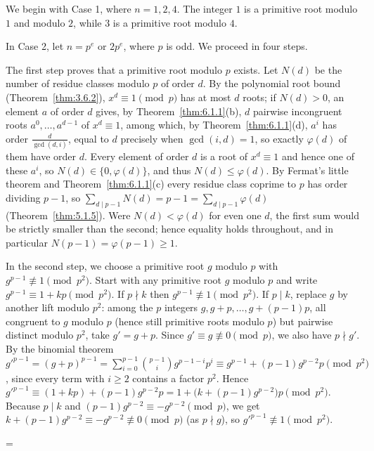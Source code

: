 \documentclass[11pt]{article}
\makeatletter
\theoremstyle{ntstyle}
\let\nt@closedisplay\]
\def\nt@guardedclose{\@ifnextchar\par{\nt@closeafterpar}{\@ifnextchar\end{\postdisplaypenalty\@M\nt@closedisplay}{\nt@closedisplay}}}
\def\nt@closeafterpar\par{\@ifnextchar\par{\nt@closeafterpar}{\@ifnextchar\end{\postdisplaypenalty\@M\nt@closedisplay\par}{\nt@closedisplay\par}}}
\renewenvironment{proof}[1][\proofname]{\par
  \pushQED{\qed}\normalfont\topsep\medskipamount\edef\nt@afterproof{\@endparpenalty=\the\@endparpenalty\relax}\@beginparpenalty\@M\@endparpenalty\@M\let\]\nt@guardedclose\trivlist\item[]\textit{#1\@addpunct{.}} \ignorespaces}{\ifvmode\addpenalty\@M\fi\popQED\nt@afterproof\endtrivlist\@endpefalse}
\makeatother
\begin{document}
\begin{proof}
	We begin with Case 1, where $n = 1, 2, 4$. The integer $1$ is a primitive root
	modulo $1$ and modulo $2$, while $3$ is a primitive root modulo $4$.

	In Case 2, let $n = p^{e}$ or $2p^{e}$, where $p$ is odd. We proceed in four steps.

	The first step proves that a primitive root modulo $p$ exists. Let $N(d)$ be the number
	of residue classes modulo $p$ of order $d$. By the polynomial root bound (Theorem~\ref{thm:3.6.2}), $x^d\equiv1\pmod{p}$ has at most $d$ roots; if $N(d) > 0$, an element $a$ of
	order $d$ gives, by Theorem~\ref{thm:6.1.1}(b), $d$ pairwise incongruent roots $a^{0}, \ldots, a^{d-1}$ of $x^{d}
		\equiv 1$, among which, by Theorem~\ref{thm:6.1.1}(d), $a^{i}$ has order
	$\frac{d}{\gcd(d, i)}$, equal to $d$ precisely when $\gcd(i, d) = 1$,
	so exactly $\varphi(d)$ of them have order $d$. Every element of
	order $d$ is a root of $x^{d} \equiv 1$ and hence one of these
	$a^{i}$, so $N(d) \in \{0, \varphi(d)\}$, and thus $N(d) \le
		\varphi(d)$. By Fermat's little theorem and Theorem~\ref{thm:6.1.1}(c) every
	residue class coprime to $p$ has order dividing $p-1$, so $\sum_{d
			\mid p-1} N(d) = p - 1 = \sum_{d \mid p-1}\varphi(d)$ (Theorem~\ref{thm:5.1.5}). Were $N(d) < \varphi(d)$ for even one $d$, the first
	sum would be strictly smaller than the second; hence equality holds
	throughout, and in particular $N(p-1) = \varphi(p-1) \ge 1$.

	In the second step, we choose a primitive root $g$ modulo $p$ with $g^{p-1} \not\equiv 1
		\pmod{p^2}$. Start with any primitive root $g$ modulo $p$ and write
	$g^{p-1} \equiv 1 + kp \pmod{p^2}$. If $p \nmid k$ then $g^{p-1}
		\not\equiv 1 \pmod{p^2}$. If $p \mid k$, replace $g$ by another lift
	modulo $p^2$: among the $p$ integers $g, g+p, \ldots, g+(p-1)p$, all
	congruent to $g$ modulo $p$ (hence still primitive roots modulo $p$)
	but pairwise distinct modulo $p^2$, take $g' = g + p$. Since $g' \equiv g \not\equiv 0 \pmod{p}$, we
	also have $p \nmid g'$. By the binomial theorem
	$g'^{p-1} = (g+p)^{p-1} = \sum_{i=0}^{p-1}
		\binom{p-1}{i} g^{p-1-i} p^{i} \equiv g^{p-1} + (p-1) g^{p-2} p
		\pmod{p^2}$, since every term with $i \ge 2$ contains a factor
	$p^{2}$. Hence $g'^{p-1} \equiv (1 + kp) + (p-1) g^{p-2} p = 1 +
		\big(k + (p-1) g^{p-2}\big) p \pmod{p^2}$. Because $p \mid k$ and
	$(p-1) g^{p-2} \equiv -g^{p-2} \pmod{p}$, we get $k + (p-1) g^{p-2}
		\equiv -g^{p-2} \not\equiv 0 \pmod{p}$ (as $p \nmid g$), so $g'^{p-1}
		\not\equiv 1 \pmod{p^2}$.


\end{proof}
\end{document}
